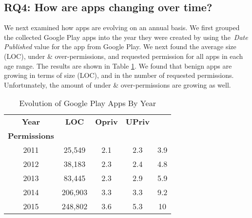 \documentclass{sig-alternate-05-2015}
\begin{document}
\subsection{RQ4: How are apps changing over time?}
We next examined how apps are evolving on an annual basis. We first grouped the collected Google Play apps into the year they were created by using the~\emph{Date Published} value for the app from Google Play. We next found the average size (LOC), under \& over-permissions, and requested permission for all apps in each age range. The results are shown in Table \ref{Table:appsByYear}. We found that benign apps are growing in terms of size (LOC), and in the number of requested permissions. Unfortunately, the amount of under \& over-permissions are growing as well.

\begin{table}
\begin{center}
\caption{Evolution of Google Play Apps By Year}
\label{Table:appsByYear} \vspace{2mm} %
 \begin{tabular}{ | c | c | c | c | c |   } \hline

  \bfseries ~~~Year~~~ &  \bfseries LOC & \bfseries Opriv & \bfseries UPriv &

        \begin{tikzpicture}
            \node[align=center, text height=3.0ex]{\bfseries Requested\\[1.2pt]\bfseries Permissions};
        \end{tikzpicture}

 \\ \hline

	2011  &  25,549 & 2.1 & 2.3 & 3.9   \\ \hline
	2012  & 38,183 & 2.3 & 2.4 & 4.8   \\ \hline
	2013  & 83,445  & 2.3 & 2.9 & 5.9   \\ \hline
	2014  & 206,903  & 3.3 & 3.3 & 9.2  \\ \hline
	2015  & 248,802 & 3.6 & 5.3 & 10  \\ \hline

  \end{tabular}
  \end{center}
\end{table}
\end{document}
